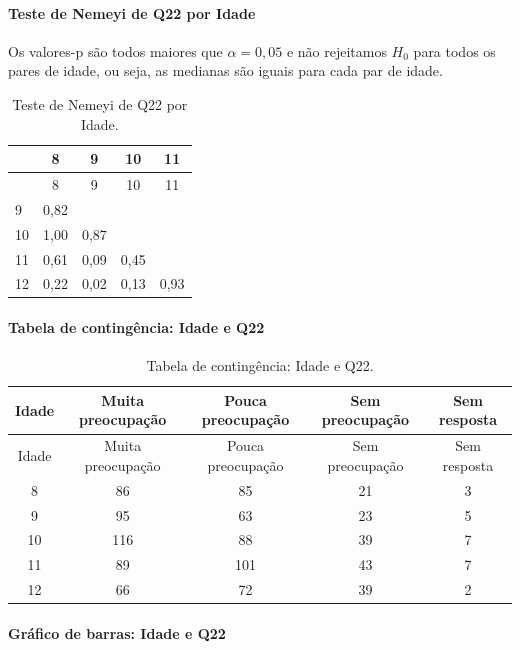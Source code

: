 \documentclass[]{article}
\let\oldparagraph\paragraph
\renewcommand{\paragraph}[1]{\oldparagraph{#1}\mbox{}}
\begin{document}
\hypertarget{teste-de-nemeyi-de-q22-por-idade}{%
\paragraph{Teste de Nemeyi de Q22 por Idade}\label{teste-de-nemeyi-de-q22-por-idade}}

Os valores-p são todos maiores que \(\alpha=0,05\) e não rejeitamos \(H_0\) para todos os pares de idade, ou seja, as medianas são iguais para cada par de idade.

\begin{longtable}[]{@{}lcccc@{}}
\caption{\label{tab:unnamed-chunk-384}Teste de Nemeyi de Q22 por Idade.}\tabularnewline
\toprule
& 8 & 9 & 10 & 11\tabularnewline
\midrule
\endfirsthead
\toprule
& 8 & 9 & 10 & 11\tabularnewline
\midrule
\endhead
9 & 0,82 & & &\tabularnewline
10 & 1,00 & 0,87 & &\tabularnewline
11 & 0,61 & 0,09 & 0,45 &\tabularnewline
12 & 0,22 & 0,02 & 0,13 & 0,93\tabularnewline
\bottomrule
\end{longtable}

\cleardoublepage

\hypertarget{tabela-de-continguxeancia-idade-e-q22-1}{%
\paragraph{Tabela de contingência: Idade e Q22}\label{tabela-de-continguxeancia-idade-e-q22-1}}

\begin{longtable}[]{@{}ccccc@{}}
\caption{\label{tab:unnamed-chunk-385}Tabela de contingência: Idade e Q22.}\tabularnewline
\toprule
Idade & Muita preocupação & Pouca preocupação & Sem preocupação & Sem resposta\tabularnewline
\midrule
\endfirsthead
\toprule
Idade & Muita preocupação & Pouca preocupação & Sem preocupação & Sem resposta\tabularnewline
\midrule
\endhead
8 & 86 & 85 & 21 & 3\tabularnewline
9 & 95 & 63 & 23 & 5\tabularnewline
10 & 116 & 88 & 39 & 7\tabularnewline
11 & 89 & 101 & 43 & 7\tabularnewline
12 & 66 & 72 & 39 & 2\tabularnewline
\bottomrule
\end{longtable}

\hypertarget{gruxe1fico-de-barras-idade-e-q22-1}{%
\paragraph{Gráfico de barras: Idade e Q22}\label{gruxe1fico-de-barras-idade-e-q22-1}}
\end{document}
